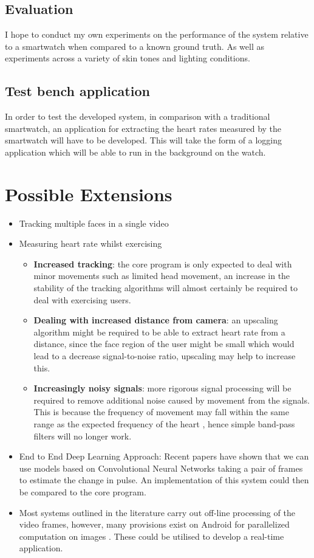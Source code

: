 \documentclass{article}
\begin{document}
\subsection*{Evaluation}
I hope to conduct my own experiments on the performance of the system relative to a smartwatch when compared to a known ground truth. As well as experiments across a variety of skin tones and lighting conditions.

\subsection*{Test bench application}
In order to test the developed system, in comparison with a traditional smartwatch, an application for extracting the heart rates measured by the smartwatch will have to be developed. This will take the form of a logging application which will be able to run in the background on the watch.

\section*{Possible Extensions}
\begin{itemize}
    \item Tracking multiple faces in a single video
    \item Measuring heart rate whilst exercising
    \begin{itemize}
        \item \textbf{Increased tracking}: the core program is only expected to deal with minor movements such as limited head movement, an increase in the stability of the tracking algorithms will almost certainly be required to deal with exercising users.
        \item \textbf{Dealing with increased distance from camera}: an upscaling algorithm might be required to be able to extract heart rate from a distance, since the face region of the user might be small which would lead to a decrease signal-to-noise ratio, upscaling may help to increase this.
        \item \textbf{Increasingly noisy signals}: more rigorous signal processing will be required to remove additional noise caused by movement from the signals. This is because the frequency of movement may fall within the same range as the expected frequency of the heart \cite{Peng2014}, hence simple band-pass filters will no longer work.
    \end{itemize}
    \item End to End Deep Learning Approach: Recent papers \cite{10.1007/978-3-030-01216-8_22} have shown that we can use models based on Convolutional Neural Networks taking a pair of frames to estimate the change in pulse. An implementation of this system could then be compared to the core program.
    \item Most systems outlined in the literature carry out off-line processing of the video frames, however, many provisions exist on Android for parallelized computation on images \cite{li2018differentiable}. These could be utilised to develop a real-time application.
\end{itemize}
\end{document}
